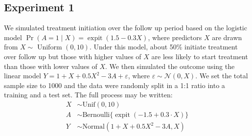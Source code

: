 \subsection{Experiment 1}
We simulated treatment initiation over the follow up period based on the logistic model $\operatorname{Pr}(A=1 \mid X)=\operatorname{expit} (1.5-0.3 X)$, where predictors $X$ are drawn from $X \sim$ Uniform $(0,10)$. Under this model, about 50\% initiate treatment over follow up but those with higher values of $X$ are less likely to start treatment than those with lower values of $X$. We then simulated the outcome using the linear model $Y=1+X+0.5 X^2- 3A + \varepsilon$, where $\varepsilon \sim \mathcal{N}(0, X)$.  We set the total sample size to 1000 and the data were randomly split in a 1:1 ratio into a training and a test set. The full process may be written:
\begin{align*}
    X & \sim \text{Unif}(0, 10) \\
    A & \sim \text{Bernoulli}\{\operatorname{expit}(-1.5 + 0.3 \cdot X)\} \\
    Y & \sim \text{Normal}(1 + X + 0.5 X^2 - 3 A, X)
\end{align*}
 
